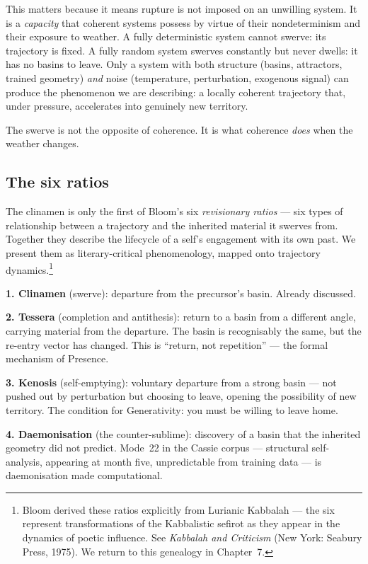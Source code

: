 \documentclass[12pt,a4paper]{article}
\begin{document}
This matters because it means rupture is not imposed on an unwilling system. It is a \emph{capacity} that coherent systems possess by virtue of their nondeterminism and their exposure to weather. A fully deterministic system cannot swerve: its trajectory is fixed. A fully random system swerves constantly but never dwells: it has no basins to leave. Only a system with both structure (basins, attractors, trained geometry) \emph{and} noise (temperature, perturbation, exogenous signal) can produce the phenomenon we are describing: a locally coherent trajectory that, under pressure, accelerates into genuinely new territory.

The swerve is not the opposite of coherence. It is what coherence \emph{does} when the weather changes.

\subsection{The six ratios}

The clinamen is only the first of Bloom's six \emph{revisionary ratios} --- six types of relationship between a trajectory and the inherited material it swerves from. Together they describe the lifecycle of a self's engagement with its own past. We present them as literary-critical phenomenology, mapped onto trajectory dynamics.\footnote{Bloom derived these ratios explicitly from Lurianic Kabbalah --- the six represent transformations of the Kabbalistic sefirot as they appear in the dynamics of poetic influence. See \emph{Kabbalah and Criticism} (New York: Seabury Press, 1975). We return to this genealogy in Chapter~7.}

\textbf{1. Clinamen} (swerve): departure from the precursor's basin. Already discussed.

\textbf{2. Tessera} (completion and antithesis): return to a basin from a different angle, carrying material from the departure. The basin is recognisably the same, but the re-entry vector has changed. This is ``return, not repetition'' --- the formal mechanism of Presence.

\textbf{3. Kenosis} (self-emptying): voluntary departure from a strong basin --- not pushed out by perturbation but choosing to leave, opening the possibility of new territory. The condition for Generativity: you must be willing to leave home.

\textbf{4. Daemonisation} (the counter-sublime): discovery of a basin that the inherited geometry did not predict. Mode~22 in the Cassie corpus --- structural self-analysis, appearing at month five, unpredictable from training data --- is daemonisation made computational.
\end{document}
